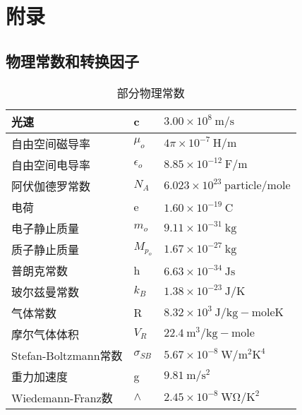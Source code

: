 \chapter*{附录}
\section{物理常数和转换因子}
\begin{table}[htbp]\small
\centering
\caption{部分物理常数}%
\begin{tabular}{|l|l|l|}
\hline
光速 & c & $3.00\times10^8\ \mathrm{m/s}$ \\ \hline
自由空间磁导率 & $\mu_o$ & $4\pi\times10^{-7}\ \mathrm{H/m}$ \\ \hline
自由空间电导率 & $\epsilon_o$ & $8.85\times10^{-12}\ \mathrm{F/m}$ \\ \hline
阿伏伽德罗常数 & $N_A $& $6.023\times10^{23}\ \mathrm{particle/mole}$ \\ \hline
电荷 & e & $1.60\times10^{-19}\ \mathrm{C}$ \\ \hline
电子静止质量 & $m_o$ & $9.11\times10^{-31}\ \mathrm{kg}$ \\ \hline
质子静止质量 & $M_{p_o}$ & $1.67\times10^{-27}\ \mathrm{kg}$ \\ \hline
普朗克常数& h & $6.63\times10^{-34}\ \mathrm{Js}$ \\ \hline
玻尔兹曼常数& $k_B$ & $1.38\times10^{-23}\ \mathrm{J/K}$ \\ \hline
气体常数 & R & $8.32\times10^3\ \mathrm{J/kg-mole K}$ \\ \hline
摩尔气体体积 & $V_R$ & $22.4\ \mathrm{m^3/kg-mole}$ \\ \hline
Stefan-Boltzmann常数& $\sigma_{SB}$ & $5.67\times10^{-8}\ \mathrm{W/m^2K^4}$ \\ \hline
重力加速度& g & $9.81\ \mathrm{m/s^2}$ \\ \hline
Wiedemann-Franz数& $\wedge$ & $2.45\times10^{-8}\ \mathrm{W\Omega/K^2}$ \\ \hline
\end{tabular}
\end{table}
\newpage

